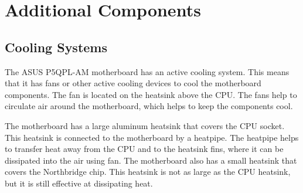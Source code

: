 \chapter{Additional Components}\label{ch:protection}
\section{Cooling Systems}

The ASUS P5QPL-AM motherboard has an active cooling system. This means that it has fans or other active cooling devices to cool the motherboard components. The fan is located on the heatsink above the CPU. The fans help to circulate air around the motherboard, which helps to keep the components cool.

The motherboard has a large aluminum heatsink that covers the CPU socket. This heatsink is connected to the motherboard by a heatpipe. The heatpipe helps to transfer heat away from the CPU and to the heatsink fins, where it can be dissipated into the air using fan. The motherboard also has a small heatsink that covers the Northbridge chip. This heatsink is not as large as the CPU heatsink, but it is still effective at dissipating heat.



